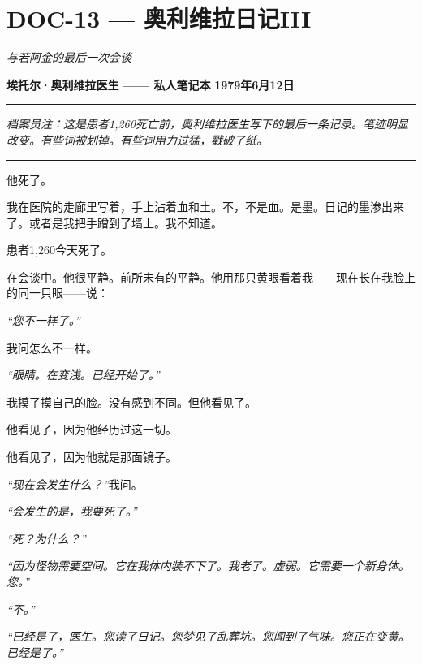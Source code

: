\section*{\textbf{DOC-13} --- 奥利维拉日记III}

\noindent \textit{与若阿金的最后一次会谈}

\noindent \textbf{埃托尔·奥利维拉医生 —— 私人笔记本}
\textbf{1979年6月12日}

\vspace{0.5em}\noindent\rule{\textwidth}{0.5pt}\vspace{0.5em}

\noindent \textit{档案员注：这是患者1,260死亡前，奥利维拉医生写下的最后一条记录。笔迹明显改变。有些词被划掉。有些词用力过猛，戳破了纸。}

\vspace{0.5em}\noindent\rule{\textwidth}{0.5pt}\vspace{0.5em}

\noindent 他死了。

\noindent 我在医院的走廊里写着，手上沾着血和土。不，不是血。是墨。日记的墨渗出来了。或者是我把手蹭到了墙上。我不知道。

\noindent 患者1,260今天死了。

\noindent 在会谈中。他很平静。前所未有的平静。他用那只黄眼看着我——现在长在我脸上的同一只眼——说：

\noindent \textit{“您不一样了。”}

\noindent 我问怎么不一样。

\noindent \textit{“眼睛。在变浅。已经开始了。”}

\noindent 我摸了摸自己的脸。没有感到不同。但他看见了。

\noindent 他看见了，因为他经历过这一切。

\noindent 他看见了，因为他就是那面镜子。

\noindent \textit{“现在会发生什么？”}我问。

\noindent \textit{“会发生的是，我要死了。”}

\noindent \textit{“死？为什么？”}

\noindent \textit{“因为怪物需要空间。它在我体内装不下了。我老了。虚弱。它需要一个新身体。您。”}

\noindent \textit{“不。”}

\noindent \textit{“已经是了，医生。您读了日记。您梦见了乱葬坑。您闻到了气味。您正在变黄。已经是了。”}

